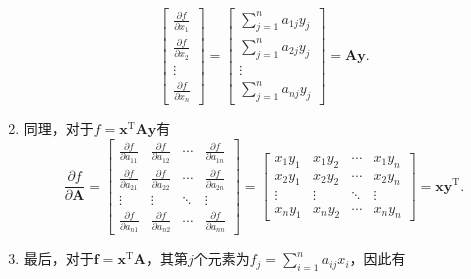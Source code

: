 \begin{solution}
\begin{enumerate}
\[\begin{bmatrix}
                      \frac{\partial f}{\partial x_1} \\
                      \frac{\partial f}{\partial x_2} \\
                      \vdots                          \\
                      \frac{\partial f}{\partial x_n}
                  \end{bmatrix} =
                  \begin{bmatrix}
                      \sum_{j=1}^{n} a_{1j} y_j \\
                      \sum_{j=1}^{n} a_{2j} y_j \\
                      \vdots                    \\
                      \sum_{j=1}^{n} a_{nj} y_j
                  \end{bmatrix} = \mathbf{A} \bm{y}.
              \]
        \item 同理，对于\( f = \bm{x}^{\mathrm{T}} \mathbf{A} \bm{y} \)有
              \[
                  \frac{\partial f}{\partial \mathbf{A}} =
                  \begin{bmatrix}
                      \frac{\partial f}{\partial a_{11}} & \frac{\partial f}{\partial a_{12}} & \cdots & \frac{\partial f}{\partial a_{1n}} \\
                      \frac{\partial f}{\partial a_{21}} & \frac{\partial f}{\partial a_{22}} & \cdots & \frac{\partial f}{\partial a_{2n}} \\
                      \vdots                             & \vdots                             & \ddots & \vdots                             \\
                      \frac{\partial f}{\partial a_{n1}} & \frac{\partial f}{\partial a_{n2}} & \cdots & \frac{\partial f}{\partial a_{nn}}
                  \end{bmatrix} =
                  \begin{bmatrix}
                      x_1 y_1 & x_1 y_2 & \cdots & x_1 y_n \\
                      x_2 y_1 & x_2 y_2 & \cdots & x_2 y_n \\
                      \vdots  & \vdots  & \ddots & \vdots  \\
                      x_n y_1 & x_n y_2 & \cdots & x_n y_n
                  \end{bmatrix} = \bm{x} \bm{y}^{\mathrm{T}}.
              \]
        \item 最后，对于\( \bm{f} = \bm{x}^{\mathrm{T}} \mathbf{A} \)，其第\( j \)个元素为\( f_j = \sum_{i=1}^{n} a_{ij} x_i \)，因此有

\end{enumerate}
\end{solution}
